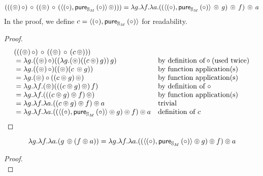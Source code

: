 \begin{lemma}
$$
(((\circledcirc)\, \circ)\, \circ\, ((\circledcirc)\, \circ\, (\langle (\circ), \mathsf{pure}_{\mathbb{S}_{M}}\,(\circ) \rangle\, \circledcirc))) = \lambda g. \lambda f. \lambda a. ( ( \langle (\circ), \mathsf{pure}_{\mathbb{S}_{M}}\,(\circ) \rangle\, \circledcirc\, g )\, \circledcirc\, f )\, \circledcirc\, a
$$
In the proof, we define $c = \langle (\circ), \mathsf{pure}_{\mathbb{S}_{M}}\,(\circ) \rangle$ for readability.
\end{lemma}
\begin{proof}
$$
\begin{array}{ll}
(((\circledcirc)\, \circ)\, \circ\, ((\circledcirc)\, \circ\, (c\, \circledcirc)))\\
{}= \lambda g. ((\circledcirc)\, \circ) ((\lambda g . (\circledcirc) ((c\, \circledcirc)\, g))\, g)
&\mbox{by definition of}\circ\mbox{(used twice)}\\
{}= \lambda g. ((\circledcirc)\, \circ) ((\circledcirc) (c\, \circledcirc g))
&\mbox{by function application(s)}\\
{}= \lambda g. (\circledcirc) \circ ((c \circledcirc g)\, \circledcirc)
&\mbox{by function application(s)}\\
{}= \lambda g. \lambda f . (\circledcirc) (((c \circledcirc g)\, \circledcirc)\, f)
&\mbox{by definition of }\circ\\
{}= \lambda g. \lambda f . (((c \circledcirc g) \circledcirc f)\, \circledcirc) 
&\mbox{by function application(s)}\\
{}= \lambda g. \lambda f . \lambda a . ((c \circledcirc g)\circledcirc f) \circledcirc a
&\mbox{trivial}\\
{}= \lambda g. \lambda f . \lambda a . ((\langle (\circ), \mathsf{pure}_{\mathbb{S}_{M}}\,(\circ) \rangle \circledcirc g)\circledcirc f) \circledcirc a
&\mbox{definition of }c\\
\end{array}
$$
\end{proof}

\begin{lemma}
$$
\lambda g . \lambda f . \lambda a .(g\, \circledcirc (f \circledcirc a)) = \lambda g. \lambda f. \lambda a. ( ( \langle (\circ), \mathsf{pure}_{\mathbb{S}_{M}}\,(\circ) \rangle \circledcirc g ) \circledcirc f ) \circledcirc a
$$
\end{lemma}
\begin{proof}
$$
$$
\end{proof}


